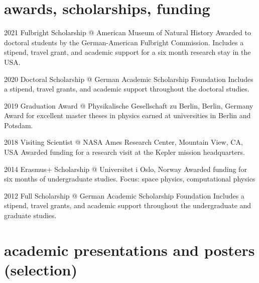 \documentclass[11pt]{k-cv} %
\begin{document}

\section{awards, scholarships, funding}

\begin{entrylist}
\entry
{2021 }
{Fulbright Scholarship @ American Museum of Natural History}
{ }
{Awarded to doctoral students by the German-American Fulbright Commission. Includes a stipend, travel grant, and academic support for a six month research stay in the USA.}

\entry
{2020 }
{Doctoral Scholarship @ German Academic Scholarship Foundation}
{}
{Includes a stipend, travel grants, and academic support throughout the doctoral studies.}

\entry
{2019}
{Graduation Award @ Physikalische Gesellschaft zu Berlin, Berlin, Germany}
{}
{Award for excellent master theses in physics earned at universities in Berlin and Potsdam.}


\entry
{2018}
{Visiting Scientist @ NASA Ames Research Center, Mountain View, CA, USA}
{}
{Awarded funding for a research visit at the Kepler mission headquarters.}


\entry
{2014}
{Erasmus+ Scholarship @ Universitet i Oslo, Norway}
{}
{Awarded funding for six months of undergraduate studies.
Focus: space physics, computational physics}

\entry
{2012 }
{Full Scholarship @ German Academic Scholarship Foundation}
{}
{Includes a stipend, travel grants, and academic support throughout the undergraduate and graduate studies.}

\end{entrylist}







\section{academic presentations and posters (selection)}
\end{document}

